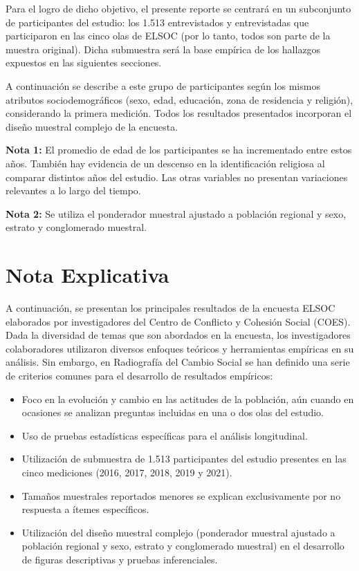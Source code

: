 \documentclass[
  12pt,
  openany]{book}
\providecommand{\tightlist}{%
  \setlength{\itemsep}{0pt}\setlength{\parskip}{0pt}}
\begin{document}
Para el logro de dicho objetivo, el presente reporte se centrará en un subconjunto de participantes del estudio: los 1.513 entrevistados y entrevistadas que participaron en las cinco olas de ELSOC (por lo tanto, todos son parte de la muestra original). Dicha submuestra será la base empírica de los hallazgos expuestos en las siguientes secciones.

A continuación se describe a este grupo de participantes según los mismos atributos sociodemográficos (sexo, edad, educación, zona de residencia y religión), considerando la primera medición. Todos los resultados presentados incorporan el diseño muestral complejo de la encuesta.

\textbf{Nota 1:} El promedio de edad de los participantes se ha incrementado entre estos años. También hay evidencia de un descenso en la identificación religiosa al comparar distintos años del estudio. Las otras variables no presentan variaciones relevantes a lo largo del tiempo.

\textbf{Nota 2:} Se utiliza el ponderador muestral ajustado a población regional y sexo, estrato y conglomerado muestral.

\hypertarget{nota-explicativa}{%
\section{Nota Explicativa}\label{nota-explicativa}}

A continuación, se presentan los principales resultados de la encuesta ELSOC elaborados por investigadores del Centro de Conflicto y Cohesión Social (COES). Dada la diversidad de temas que son abordados en la encuesta, los investigadores colaboradores utilizaron diversos enfoques teóricos y herramientas empíricas en su análisis. Sin embargo, en Radiografía del Cambio Social se han definido una serie de criterios comunes para el desarrollo de resultados empíricos:

\begin{itemize}
\tightlist
\item
  Foco en la evolución y cambio en las actitudes de la población, aún cuando en ocasiones se analizan preguntas incluidas en una o dos olas del estudio.
\item
  Uso de pruebas estadísticas específicas para el análisis longitudinal.
\item
  Utilización de submuestra de 1.513 participantes del estudio presentes en las cinco mediciones (2016, 2017, 2018, 2019 y 2021).
\item
  Tamaños muestrales reportados menores se explican exclusivamente por no respuesta a ítemes específicos.
\item
  Utilización del diseño muestral complejo (ponderador muestral ajustado a población regional y sexo, estrato y conglomerado muestral) en el desarrollo de figuras descriptivas y pruebas inferenciales.
\end{itemize}
\end{document}
